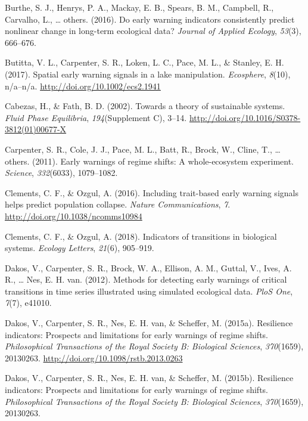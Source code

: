 \documentclass[12pt,twoside,openany]{reedthesis}
\begin{document}
\leavevmode\hypertarget{ref-burthe2016early}{}%
Burthe, S. J., Henrys, P. A., Mackay, E. B., Spears, B. M., Campbell, R., Carvalho, L., \ldots{} others. (2016). Do early warning indicators consistently predict nonlinear change in long-term ecological data? \emph{Journal of Applied Ecology}, \emph{53}(3), 666--676.

\leavevmode\hypertarget{ref-butitta_spatial_2017}{}%
Butitta, V. L., Carpenter, S. R., Loken, L. C., Pace, M. L., \& Stanley, E. H. (2017). Spatial early warning signals in a lake manipulation. \emph{Ecosphere}, \emph{8}(10), n/a--n/a. \url{http://doi.org/10.1002/ecs2.1941}

\leavevmode\hypertarget{ref-cabezas_towards_2002}{}%
Cabezas, H., \& Fath, B. D. (2002). Towards a theory of sustainable systems. \emph{Fluid Phase Equilibria}, \emph{194}(Supplement C), 3--14. \url{http://doi.org/10.1016/S0378-3812(01)00677-X}

\leavevmode\hypertarget{ref-carpenter2011early}{}%
Carpenter, S. R., Cole, J. J., Pace, M. L., Batt, R., Brock, W., Cline, T., \ldots{} others. (2011). Early warnings of regime shifts: A whole-ecosystem experiment. \emph{Science}, \emph{332}(6033), 1079--1082.

\leavevmode\hypertarget{ref-clements_including_2016}{}%
Clements, C. F., \& Ozgul, A. (2016). Including trait-based early warning signals helps predict population collapse. \emph{Nature Communications}, \emph{7}. \url{http://doi.org/10.1038/ncomms10984}

\leavevmode\hypertarget{ref-clements2018indicators}{}%
Clements, C. F., \& Ozgul, A. (2018). Indicators of transitions in biological systems. \emph{Ecology Letters}, \emph{21}(6), 905--919.

\leavevmode\hypertarget{ref-dakos_methods_2012}{}%
Dakos, V., Carpenter, S. R., Brock, W. A., Ellison, A. M., Guttal, V., Ives, A. R., \ldots{} Nes, E. H. van. (2012). Methods for detecting early warnings of critical transitions in time series illustrated using simulated ecological data. \emph{PloS One}, \emph{7}(7), e41010.

\leavevmode\hypertarget{ref-dakos_resilience_2015}{}%
Dakos, V., Carpenter, S. R., Nes, E. H. van, \& Scheffer, M. (2015a). Resilience indicators: Prospects and limitations for early warnings of regime shifts. \emph{Philosophical Transactions of the Royal Society B: Biological Sciences}, \emph{370}(1659), 20130263. \url{http://doi.org/10.1098/rstb.2013.0263}

\leavevmode\hypertarget{ref-dakos2015resilience}{}%
Dakos, V., Carpenter, S. R., Nes, E. H. van, \& Scheffer, M. (2015b). Resilience indicators: Prospects and limitations for early warnings of regime shifts. \emph{Philosophical Transactions of the Royal Society B: Biological Sciences}, \emph{370}(1659), 20130263.
\end{document}
